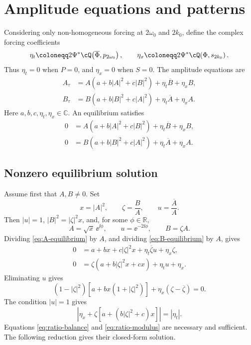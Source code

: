 \section{Amplitude equations and patterns}

Considering only non-homogeneous forcing at $2\omega_0$ and $2k_0$, define
the complex forcing coefficients
\[
 \eta_t\coloneqq
 2\Psi^*\cQ\!\left(\overline\Phi,p_{2\omega_0}\right),
 \qquad
 \eta_x\coloneqq
 2\Psi^*\cQ\!\left(\Phi,s_{2k_0}\right).
\]
Thus $\eta_t=0$ when $P=0$, and $\eta_x=0$ when $S=0$.  The amplitude
equations are
\begin{subequations}
\label{eq:amplitude}
\begin{align}
 A_\tau&=A\left(a+b|A|^2+c|B|^2\right)
          +\eta_t\overline B+\eta_xB,
 \label{eq:A}\\
 B_\tau&=B\left(a+b|B|^2+c|A|^2\right)
          +\eta_t\overline A+\eta_xA.
 \label{eq:B}
\end{align}
\end{subequations}
Here $a,b,c,\eta_t,\eta_x\in\mathbb C$.  An equilibrium satisfies
\begin{align}
 0&=A\left(a+b|A|^2+c|B|^2\right)
       +\eta_t\overline B+\eta_xB,
 \label{eq:A-equilibrium}\\
 0&=B\left(a+b|B|^2+c|A|^2\right)
       +\eta_t\overline A+\eta_xA.
 \label{eq:B-equilibrium}
\end{align}

\subsection{Nonzero equilibrium solution}

Assume first that $A,B\neq0$.  Set
\[
 x=|A|^2,
 \qquad
 \zeta=\frac BA,
 \qquad
 u=\frac{\overline A}{A}.
\]
Then $|u|=1$, $|B|^2=|\zeta|^2x$, and, for some $\phi\in\mathbb R$,
\[
 A=\sqrt{x}\,\ee^{\ii\phi},
 \qquad
 u=\ee^{-2\ii\phi},
 \qquad
 B=\zeta A.
\]
Dividing \eqref{eq:A-equilibrium} by $A$, and dividing
\eqref{eq:B-equilibrium} by $A$, gives
\begin{align}
 0&=a+bx+c|\zeta|^2x
      +\eta_t\overline\zeta u+\eta_x\zeta,
 \label{eq:ratio-A}\\
 0&=\zeta\left(a+b|\zeta|^2x+cx\right)
      +\eta_tu+\eta_x.
 \label{eq:ratio-B}
\end{align}
Eliminating $u$ gives
\begin{equation}
 \left(1-|\zeta|^2\right)
 \left[a+bx\left(1+|\zeta|^2\right)\right]
 +\eta_x\left(\zeta-\overline\zeta\right)=0.
 \label{eq:ratio-balance}
\end{equation}
The condition $|u|=1$ gives
\begin{equation}
 \left|
 \eta_x+\zeta\left[a+\left(b|\zeta|^2+c\right)x\right]
 \right|=|\eta_t|.
 \label{eq:ratio-modulus}
\end{equation}
Equations \eqref{eq:ratio-balance} and \eqref{eq:ratio-modulus} are
necessary and sufficient.  The following reduction gives their closed-form
solution.

